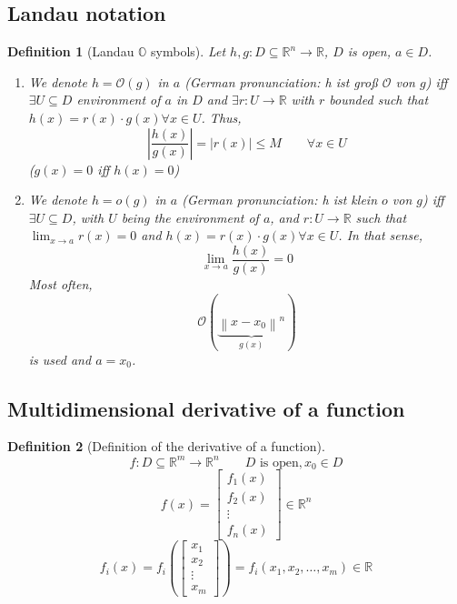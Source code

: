 \documentclass{article}
\newtheorem{definition}{Definition}  \numberwithin{definition}{section}
\newcommand{\norm}[1]{\left\|#1\right\|}
\newcommand{\card}[1]{\left|#1\right|}
\begin{document}
\subsection{Landau notation}
\begin{definition}[Landau $\mathbb O$ symbols] %
  Let $h, g: D \subseteq \mathbb R^n \to \mathbb R$, $D$ is open, $a \in D$.
  \begin{enumerate}
    \item We denote $h = \mathcal O(g)$ in $a$ (German pronunciation: \foreignlanguage{german}{h ist groß $\mathcal O$ von $g$}) iff
      $\exists U \subseteq D$ environment of $a$ in $D$ and $\exists r: U \to \mathbb R$ with $r$ bounded such that $h(x) = r(x) \cdot g(x) \forall x \in U$.
      Thus,
      \[ \card{\frac{h(x)}{g(x)}} = \card{r(x)} \leq M \qquad \forall x \in U \]
      ($g(x) = 0$ iff $h(x) = 0$)
    \item We denote $h = o(g)$ in $a$ (German pronunciation: \foreignlanguage{german}{h ist klein $o$ von $g$}) iff $\exists U \subseteq D$, with $U$ being the environment of $a$, and $r: U \to \mathbb R$ such that $\lim_{x\to a} r(x) = 0$
    and $h(x) = r(x) \cdot g(x) \forall x \in U$. In that sense,
      \[ \lim_{x \to a} \frac{h(x)}{g(x)} = 0 \]
      Most often,
      \[ \mathcal O(\underbrace{\norm{x - x_0}^n}_{g(x)}) \]
      is used and $a = x_0$.
  \end{enumerate}
\end{definition}

\subsection{Multidimensional derivative of a function}
\begin{definition}[Definition of the derivative of a function]
  \[ f: D \subseteq \mathbb R^m \to \mathbb R^n \qquad D \text{ is open}, x_0 \in D \]
  \[ f(x) = \begin{bmatrix} f_1(x) \\ f_2(x) \\ \vdots \\ f_n(x) \end{bmatrix} \in \mathbb R^n \]
  \[ f_i(x) = f_i\left(\begin{bmatrix} x_1 \\ x_2 \\ \vdots \\ x_m \end{bmatrix}\right) = f_i(x_1, x_2, \dots, x_m) \in \mathbb R \]
\end{definition}
\end{document}
